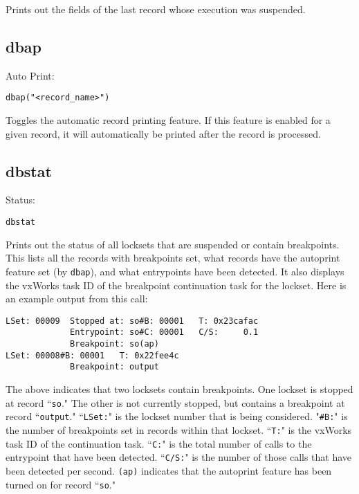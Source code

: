 Prints out the fields of the last record whose execution was suspended.

\subsection{dbap}

Auto Print:

\begin{verbatim}
dbap("<record_name>")
\end{verbatim}

Toggles the automatic record printing feature. If this feature is enabled for a given record, it will automatically be printed 
after the record is processed.

\subsection{dbstat}

Status:

\begin{verbatim}
dbstat
\end{verbatim}

Prints out the status of all locksets that are suspended or contain breakpoints. This lists all the records with breakpoints 
set, what records have the autoprint feature set (by \verb|dbap|), and what entrypoints have been detected. It also displays the 
vxWorks task ID of the breakpoint continuation task for the lockset. Here is an example output from this call:

\begin{verbatim}
LSet: 00009  Stopped at: so#B: 00001   T: 0x23cafac
             Entrypoint: so#C: 00001   C/S:     0.1
             Breakpoint: so(ap)
LSet: 00008#B: 00001   T: 0x22fee4c
             Breakpoint: output
\end{verbatim}

The above indicates that two locksets contain breakpoints. One lockset is stopped at record ``\verb|so|." The other is not 
currently stopped, but contains a breakpoint at record ``\verb|output|." ``\verb|LSet:|" is the lockset number that is being considered. 
"\verb|#B:|" is the number of breakpoints set in records within that lockset. ``\verb|T:|" is the vxWorks task ID of the continuation 
task. ``\verb|C:|" is the total number of calls to the entrypoint that have been detected. ``\verb|C/S:|" is the number of those calls that 
have been detected per second. \verb|(ap)| indicates that the autoprint feature has been turned on for record ``\verb|so|."

